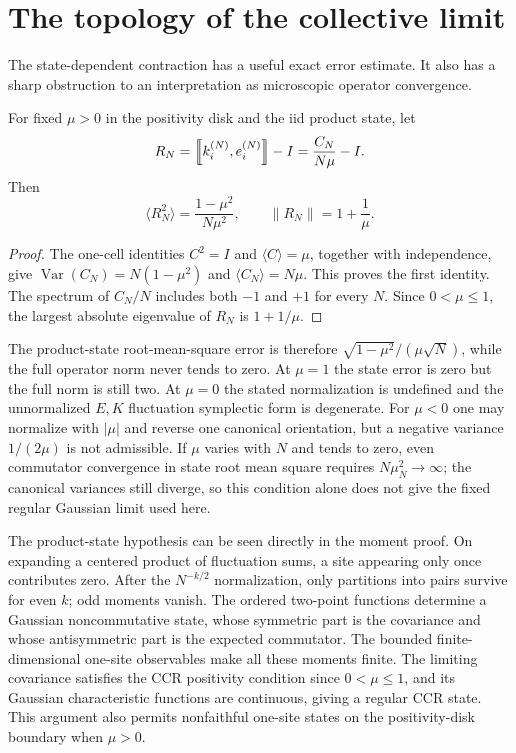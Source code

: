 \section{The topology of the collective limit}
The state-dependent contraction has a useful exact error estimate.
It also has a sharp obstruction to an interpretation as microscopic operator convergence.

\begin{proposition}\label{prop:error}
For fixed $\mu>0$ in the positivity disk and the iid product state, let
\begin{equation}
 R_N=\left\llbracket k_i^{(N)},e_i^{(N)}\right\rrbracket-I=\frac{C_N}{N\mu}-I.
\end{equation}
Then
\begin{equation}
 \langle R_N^2\rangle=\frac{1-\mu^2}{N\mu^2},
 \qquad
 \|R_N\|=1+\frac1\mu.
\end{equation}
\end{proposition}
\begin{proof}
The one-cell identities $C^2=I$ and $\langle C\rangle=\mu$, together with independence, give $\operatorname{Var}(C_N)=N(1-\mu^2)$ and $\langle C_N\rangle=N\mu$.
This proves the first identity.
The spectrum of $C_N/N$ includes both $-1$ and $+1$ for every $N$.
Since $0<\mu\leq1$, the largest absolute eigenvalue of $R_N$ is $1+1/\mu$.
\end{proof}

The product-state root-mean-square error is therefore $\sqrt{1-\mu^2}/(\mu\sqrt N)$, while the full operator norm never tends to zero.
At $\mu=1$ the state error is zero but the full norm is still two.
At $\mu=0$ the stated normalization is undefined and the unnormalized $E,K$ fluctuation symplectic form is degenerate.
For $\mu<0$ one may normalize with $|\mu|$ and reverse one canonical orientation, but a negative variance $1/(2\mu)$ is not admissible.
If $\mu$ varies with $N$ and tends to zero, even commutator convergence in state root mean square requires $N\mu_N^2\to\infty$; the canonical variances still diverge, so this condition alone does not give the fixed regular Gaussian limit used here.

The product-state hypothesis can be seen directly in the moment proof.
On expanding a centered product of fluctuation sums, a site appearing only once contributes zero.
After the $N^{-k/2}$ normalization, only partitions into pairs survive for even $k$; odd moments vanish.
The ordered two-point functions determine a Gaussian noncommutative state, whose symmetric part is the covariance and whose antisymmetric part is the expected commutator.
The bounded finite-dimensional one-site observables make all these moments finite.
The limiting covariance satisfies the CCR positivity condition since $0<\mu\leq1$, and its Gaussian characteristic functions are continuous, giving a regular CCR state.
This argument also permits nonfaithful one-site states on the positivity-disk boundary when $\mu>0$.

